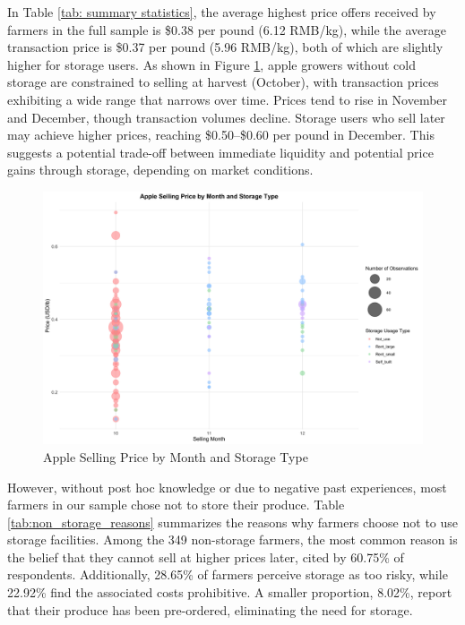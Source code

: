 \documentclass[12pt]{article}
\begin{document}


In Table \ref{tab: summary statistics}, the average highest price offers received by farmers in the full sample is \$0.38 per pound (6.12 RMB/kg), while the average transaction price is \$0.37 per pound (5.96 RMB/kg), both of which are slightly higher for storage users. As shown in Figure \ref{Figure: selling price bubble}, apple growers without cold storage are constrained to selling at harvest (October), with transaction prices exhibiting a wide range that narrows over time. Prices tend to rise in November and December, though transaction volumes decline. Storage users who sell later may achieve higher prices, reaching \$0.50–\$0.60 per pound in December. This suggests a potential trade-off between immediate liquidity and potential price gains through storage, depending on market conditions.

\begin{figure}[H]
\centering
\includegraphics[width=1\textwidth]{figures/apple_price_bubble_plot.png}
\caption{Apple Selling Price by Month and Storage Type}
\label{Figure: selling price bubble}
\end{figure}

However, without post hoc knowledge or due to negative past experiences, most farmers in our sample chose not to store their produce. Table \ref{tab:non_storage_reasons} summarizes the reasons why farmers choose not to use storage facilities. Among the 349 non-storage farmers, the most common reason is the belief that they cannot sell at higher prices later, cited by 60.75\% of respondents. Additionally, 28.65\% of farmers perceive storage as too risky, while 22.92\% find the associated costs prohibitive. A smaller proportion, 8.02\%, report that their produce has been pre-ordered, eliminating the need for storage.
\end{document}
